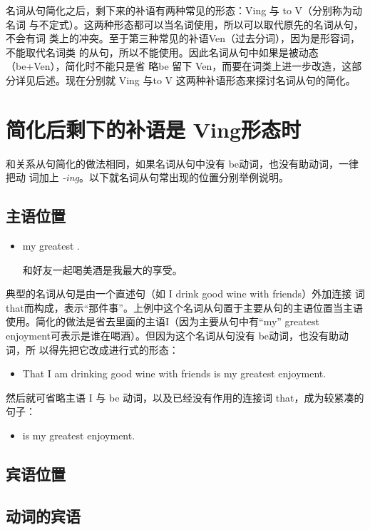 名词从句简化之后，剩下来的补语有两种常见的形态：Ving 与 to V（分别称为动名词
与不定式）。这两种形态都可以当名词使用，所以可以取代原先的名词从句，不会有词
类上的冲突。至于第三种常见的补语Ven（过去分词），因为是形容词，不能取代名词类
的从句，所以不能使用。因此名词从句中如果是被动态（be+Ven），简化时不能只是省
略be 留下 Ven，而要在词类上进一步改造，这部分详见后述。现在分别就 Ving 与to
V 这两种补语形态来探讨名词从句的简化。

\section{简化后剩下的补语是 Ving形态时}

和关系从句简化的做法相同，如果名词从句中没有 be动词，也没有助动词，一律把动
词加上 \emph{-ing}。以下就名词从句常出现的位置分别举例说明。

\subsection{主语位置}

\begin{itemize}
\item {}  my greatest .

  和好友一起喝美酒是我最大的享受。
\end{itemize}
典型的名词从句是由一个直述句（如 I drink good wine with friends）外加连接
词 that而构成，表示“那件事”。上例中这个名词从句置于主要从句的主语位置当主语
使用。简化的做法是省去里面的主语I（因为主要从句中有“my” greatest
enjoyment可表示是谁在喝酒）。但因为这个名词从句没有 be动词，也没有助动词，所
以得先把它改成进行式的形态：
\begin{itemize}
\item That I am drinking good wine with friends is my greatest enjoyment.
\end{itemize}
然后就可省略主语 I 与 be 动词，以及已经没有作用的连接词
that，成为较紧凑的句子：
\begin{itemize}
\item {} is my greatest enjoyment.
\end{itemize}

\subsection{宾语位置}

\subsection{动词的宾语}

